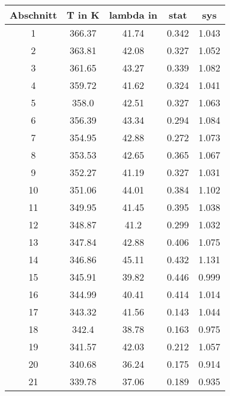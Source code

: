 \documentclass{article}
\begin{document}
\begin{tabular}{c|c|c|c|c}
Abschnitt&T in K&lambda in &stat&sys\\
\hline
1&366.37&41.74&0.342&1.043\\
2&363.81&42.08&0.327&1.052\\
3&361.65&43.27&0.339&1.082\\
4&359.72&41.62&0.324&1.041\\
5&358.0&42.51&0.327&1.063\\
6&356.39&43.34&0.294&1.084\\
7&354.95&42.88&0.272&1.073\\
8&353.53&42.65&0.365&1.067\\
9&352.27&41.19&0.327&1.031\\
10&351.06&44.01&0.384&1.102\\
11&349.95&41.45&0.395&1.038\\
12&348.87&41.2&0.299&1.032\\
13&347.84&42.88&0.406&1.075\\
14&346.86&45.11&0.432&1.131\\
15&345.91&39.82&0.446&0.999\\
16&344.99&40.41&0.414&1.014\\
17&343.32&41.56&0.143&1.044\\
18&342.4&38.78&0.163&0.975\\
19&341.57&42.03&0.212&1.057\\
20&340.68&36.24&0.175&0.914\\
21&339.78&37.06&0.189&0.935\\
\end{tabular}
\end{document}
